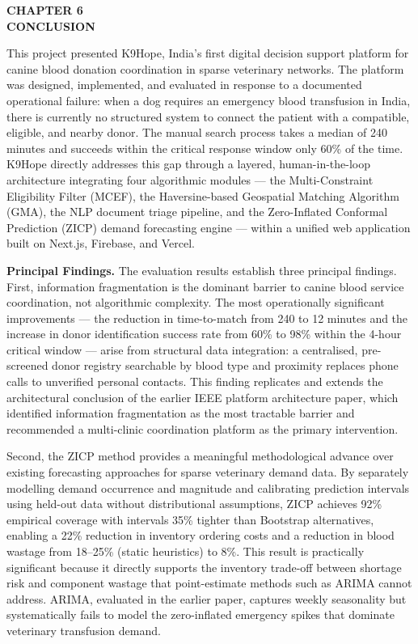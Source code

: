 \documentclass[12pt,a4paper]{article}
\begin{document}
\newpage
\begin{center}
    \textbf{\large CHAPTER 6}\\[0.4em]
    \textbf{\large CONCLUSION}
\end{center}
\vspace{1.5em}

\noindent This project presented K9Hope, India's first digital decision support platform for canine blood donation coordination in sparse veterinary networks. The platform was designed, implemented, and evaluated in response to a documented operational failure: when a dog requires an emergency blood transfusion in India, there is currently no structured system to connect the patient with a compatible, eligible, and nearby donor. The manual search process takes a median of 240 minutes and succeeds within the critical response window only 60\% of the time. K9Hope directly addresses this gap through a layered, human-in-the-loop architecture integrating four algorithmic modules — the Multi-Constraint Eligibility Filter (MCEF), the Haversine-based Geospatial Matching Algorithm (GMA), the NLP document triage pipeline, and the Zero-Inflated Conformal Prediction (ZICP) demand forecasting engine — within a unified web application built on Next.js, Firebase, and Vercel.

\vspace{1.5em}
\noindent\textbf{Principal Findings.} The evaluation results establish three principal findings. First, information fragmentation is the dominant barrier to canine blood service coordination, not algorithmic complexity. The most operationally significant improvements — the reduction in time-to-match from 240 to 12 minutes and the increase in donor identification success rate from 60\% to 98\% within the 4-hour critical window — arise from structural data integration: a centralised, pre-screened donor registry searchable by blood type and proximity replaces phone calls to unverified personal contacts. This finding replicates and extends the architectural conclusion of the earlier IEEE platform architecture paper, which identified information fragmentation as the most tractable barrier and recommended a multi-clinic coordination platform as the primary intervention.

\noindent Second, the ZICP method provides a meaningful methodological advance over existing forecasting approaches for sparse veterinary demand data. By separately modelling demand occurrence and magnitude and calibrating prediction intervals using held-out data without distributional assumptions, ZICP achieves 92\% empirical coverage with intervals 35\% tighter than Bootstrap alternatives, enabling a 22\% reduction in inventory ordering costs and a reduction in blood wastage from 18--25\% (static heuristics) to 8\%. This result is practically significant because it directly supports the inventory trade-off between shortage risk and component wastage that point-estimate methods such as ARIMA cannot address. ARIMA, evaluated in the earlier paper, captures weekly seasonality but systematically fails to model the zero-inflated emergency spikes that dominate veterinary transfusion demand.
\end{document}
